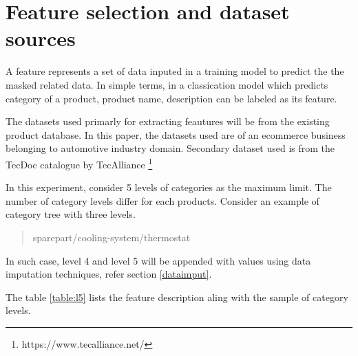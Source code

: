 \section {Feature selection and dataset sources}

A feature represents a set of data inputed in a training model to predict the the masked related data. In simple terms, in a classication model which predicts category of a product, product name, description can be labeled as its feature. 

The datasets used primarly for extracting feautures will be from the existing product database. In this paper, the datasets used are of an ecommerce business belonging to automotive industry domain. Secondary dataset used is from the TecDoc catalogue by TecAlliance \footnote{https://www.tecalliance.net/}

 In this experiment, consider 5 levels of categories as the maximum limit. The number of category levels differ for each products. Consider an example of category tree with three levels. 

\begin{quote} 
\centering 
sparepart/cooling-system/thermostat
\end{quote}
In such case, level 4 and level 5 will be appended with values using data imputation techniques, refer section \ref{dataimput}. 

The table \ref{table:l5} lists the feature description aling with the sample of category levels.



